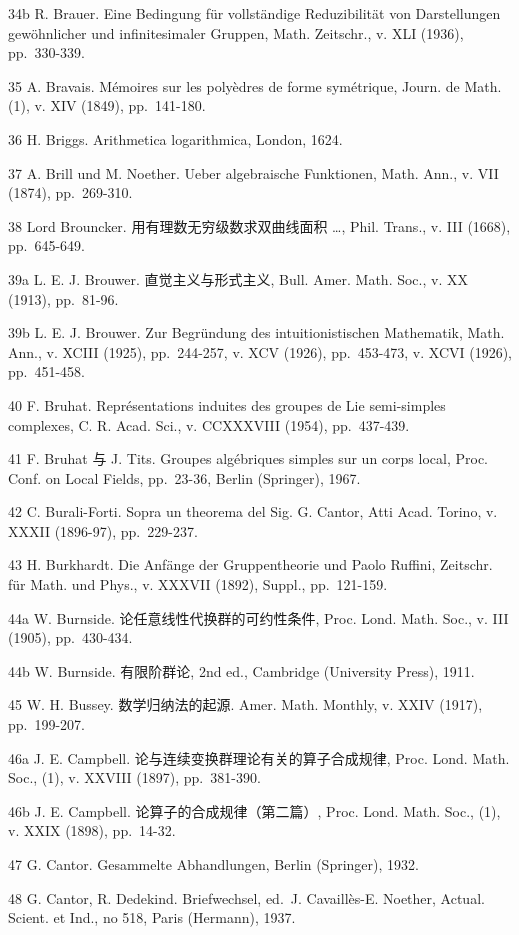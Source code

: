 34b R. Brauer. Eine Bedingung für vollständige Reduzibilität von Darstellungen gewöhnlicher und infinitesimaler Gruppen, Math. Zeitschr., v. XLI (1936), pp.~330-339.

35 A. Bravais. Mémoires sur les polyèdres de forme symétrique, Journ. de Math. (1), v. XIV (1849), pp.~141-180.

36 H. Briggs. Arithmetica logarithmica, London, 1624.

37 A. Brill und M. Noether. Ueber algebraische Funktionen, Math. Ann., v. VII (1874), pp.~269-310.

38 Lord Brouncker. 用有理数无穷级数求双曲线面积 \ldots, Phil. Trans., v. III (1668), pp.~645-649.

39a L. E. J. Brouwer. 直觉主义与形式主义, Bull. Amer. Math. Soc., v. XX (1913), pp.~81-96.

39b L. E. J. Brouwer. Zur Begründung des intuitionistischen Mathematik, Math. Ann., v. XCIII (1925), pp.~244-257, v. XCV (1926), pp.~453-473, v. XCVI (1926), pp.~451-458.

40 F. Bruhat. Représentations induites des groupes de Lie semi-simples complexes, C. R. Acad. Sci., v. CCXXXVIII (1954), pp.~437-439.

41 F. Bruhat 与 J. Tits. Groupes algébriques simples sur un corps local, Proc. Conf. on Local Fields, pp.~23-36, Berlin (Springer), 1967.

42 C. Burali-Forti. Sopra un theorema del Sig. G. Cantor, Atti Acad. Torino, v. XXXII (1896-97), pp.~229-237.

43 H. Burkhardt. Die Anfänge der Gruppentheorie und Paolo Ruffini, Zeitschr. für Math. und Phys., v. XXXVII (1892), Suppl., pp.~121-159.

44a W. Burnside. 论任意线性代换群的可约性条件, Proc. Lond. Math. Soc., v. III (1905), pp.~430-434.

44b W. Burnside. 有限阶群论, 2nd ed., Cambridge (University Press), 1911.

45 W. H. Bussey. 数学归纳法的起源. Amer. Math. Monthly, v. XXIV (1917), pp.~199-207.

46a J. E. Campbell. 论与连续变换群理论有关的算子合成规律, Proc. Lond. Math. Soc., (1), v. XXVIII (1897), pp.~381-390.

46b J. E. Campbell. 论算子的合成规律（第二篇）, Proc. Lond. Math. Soc., (1), v. XXIX (1898), pp.~14-32.

47 G. Cantor. Gesammelte Abhandlungen, Berlin (Springer), 1932.

48 G. Cantor, R. Dedekind. Briefwechsel, ed.~J. Cavaillès-E. Noether, Actual. Scient. et Ind., no 518, Paris (Hermann), 1937.

